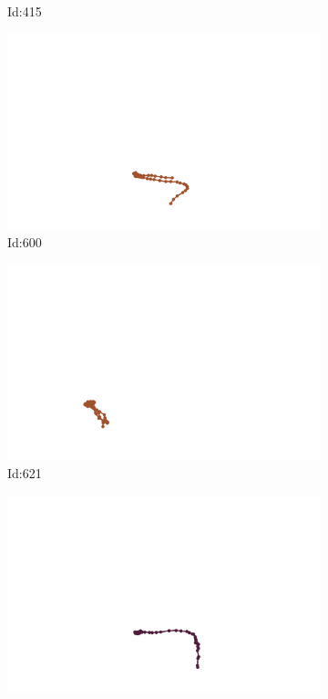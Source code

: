 \documentclass[12pt,twoside]{report}
\begin{document}
\begin{figure}
\begin{subfigure}[b]{0.20\textwidth}
\caption{Id:415}
\end{subfigure}
\begin{subfigure}[b]{0.20\textwidth}
\centering
\includegraphics[width=\textwidth]{../trajectories/600.png}
\caption{Id:600}
\end{subfigure}
\begin{subfigure}[b]{0.20\textwidth}
\centering
\includegraphics[width=\textwidth]{../trajectories/621.png}
\caption{Id:621}
\end{subfigure}
\begin{subfigure}[b]{0.20\textwidth}
\centering
\includegraphics[width=\textwidth]{../trajectories/711.png}

\end{subfigure}
\end{figure}
\end{document}
